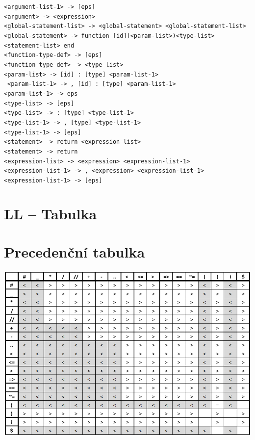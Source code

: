 \documentclass[11pt]{article}
\begin{document}
        \verb|<argument-list-1> -> [eps]| \\
        \verb|<argument> -> <expression>| \\
        \verb|<global-statement-list> -> <global-statement> <global-statement-list>| \\
        \verb|<global-statement> -> function [id](<param-list>)<type-list> <statement-list> end| \\
        \verb|<function-type-def> -> [eps]| \\
        \verb|<function-type-def> -> <type-list>| \\
        \verb|<param-list> -> [id] : [type] <param-list-1>| \\\,
        \verb|<param-list-1> -> , [id] : [type] <param-list-1>| \\
        \verb|<param-list-1> -> eps| \\
        \verb|<type-list> -> [eps]| \\
        \verb|<type-list> -> : [type] <type-list-1>| \\
        \verb|<type-list-1> -> , [type] <type-list-1>| \\
        \verb|<type-list-1> -> [eps]| \\
        \verb|<statement> -> return <expression-list>| \\
        \verb|<statement> -> return| \\
        \verb|<expression-list> -> <expression> <expression-list-1>| \\
        \verb|<expression-list-1> -> , <expression> <expression-list-1>| \\
        \verb|<expression-list-1> -> [eps]| \\

        \pagebreak
        
    \section{LL -- Tabulka}
        
    \section{Precedenční tabulka}
        \includegraphics[width=1\linewidth]{precedenční tabulka.png}
        \pagebreak    
\end{document}

